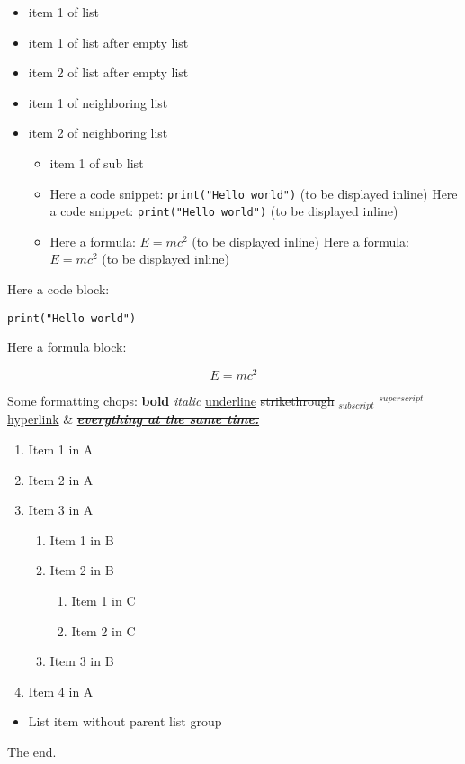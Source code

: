 \begin{itemize}
\item item 1 of list
\end{itemize}

\begin{itemize}
\item item 1 of list after empty list
\item item 2 of list after empty list
\end{itemize}

\begin{itemize}
\item item 1 of neighboring list
\item item 2 of neighboring list
  \begin{itemize}
\item item 1 of sub list
\item Here a code snippet: \texttt{print("Hello world")} (to be displayed inline)
Here a code snippet: \texttt{print("Hello world")} (to be displayed inline)
\item Here a formula: $E=mc^2$ (to be displayed inline)
Here a formula: $E=mc^2$ (to be displayed inline)
  \end{itemize}
\end{itemize}

Here a code block:

\begin{verbatim}
print("Hello world")
\end{verbatim}

Here a formula block:

$$E=mc^2$$



Some formatting chops: \textbf{bold} \textit{italic} \underline{underline} \sout{strikethrough} $_{subscript}$ $^{superscript}$ \href{.}{hyperlink} \& \href{https://github.com/DS4SD/docling}{\sout{\underline{\textit{\textbf{everything at the same time.}}}}}

\begin{enumerate}
\item Item 1 in A
\item Item 2 in A
\item Item 3 in A
  \begin{enumerate}
\item Item 1 in B
\item Item 2 in B
    \begin{enumerate}
\item Item 1 in C
\item Item 2 in C
    \end{enumerate}
\item Item 3 in B
  \end{enumerate}
\item Item 4 in A
\end{enumerate}

\begin{itemize}
\item List item without parent list group
\end{itemize}

The end.
